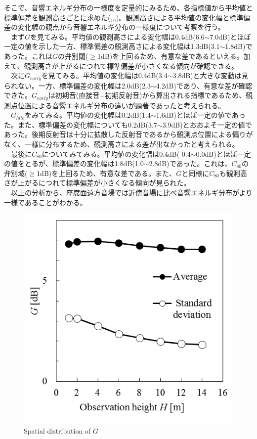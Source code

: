 そこで、音響エネルギ分布の一様度を定量的にみるため、各指標値から平均値と標準偏差を観測高さごとに求めた(,,,)。観測高さによる平均値の変化幅と標準偏差の変化幅の観点から音響エネルギ分布の一様度について考察を行う。
\\　まず$G$を見てみる。平均値の観測高さによる変化幅は0.4dB(6.6$\sim$7.0dB)とほぼ一定の値を示した一方、標準偏差の観測高さによる変化幅は1.3dB(3.1$\sim$1.8dB)であった。これは$G$の弁別閾($\geq$1dB)を上回るため、有意な差であるといえる。加えて、観測高さが上がるにつれて標準偏差が小さくなる傾向が確認できる。
\\　次に$G_{early}$を見てみる。平均値の変化幅は0.4dB(3.4$\sim$3.8dB)と大きな変動は見られない。一方、標準偏差の変化幅は2.0dB(2.3$\sim$4.2dB)であり、有意な差が確認できた。$G_{early}$は初期音(直接音+初期反射音)から算出される指標であるため、観測点位置による音響エネルギ分布の違いが顕著であったと考えられる。
\\　$G_{late}$をみてみる。平均値の変化幅は0.2dB(1.4$\sim$1.6dB)とほぼ一定の値であった。また、標準偏差の変化幅についても0.2dB(3.7$\sim$3.9dB)とおおよそ一定の値であった。後期反射音は十分に拡散した反射音であるから観測点位置による偏りがなく、一様に分布するため、観測高さによる差が出なかったと考えられる。
\\　最後に$C_{80}$についてみてみる。平均値の変化幅は0.4dB(-0.4$\sim$0.0dB)とほぼ一定の値をとるが、標準偏差の変化幅は1.8dB(1.0$\sim$2.8dB)であった。これは、$C_{80}$の弁別域($\geq$1dB)を上回るため、有意な差である。また、$G$と同様に$C_{80}$も観測高さが上がるにつれて標準偏差が小さくなる傾向が見られた。
\\　以上の分析から、座席面遠方音場では近傍音場に比べ音響エネルギ分布がより一様であることがわかる。

\begin{figure}[htbp]
    \centering
    \includegraphics[keepaspectratio,scale=1]{04_att/G.png}
    \caption{\hspace{1mm}Spatial distribution of $G$}
    \label{fig:G}
\end{figure}

